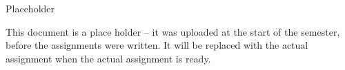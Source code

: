 \documentclass[10pt]{article}
\begin{document}
\thispagestyle{empty}
\handout




\begin{problem} Placeholder \end{problem}

This document is a place holder -- it was uploaded at the start of the semester, before the assignments were written.  It will be replaced with the actual assignment when the actual assignment is ready.
\end{document}
